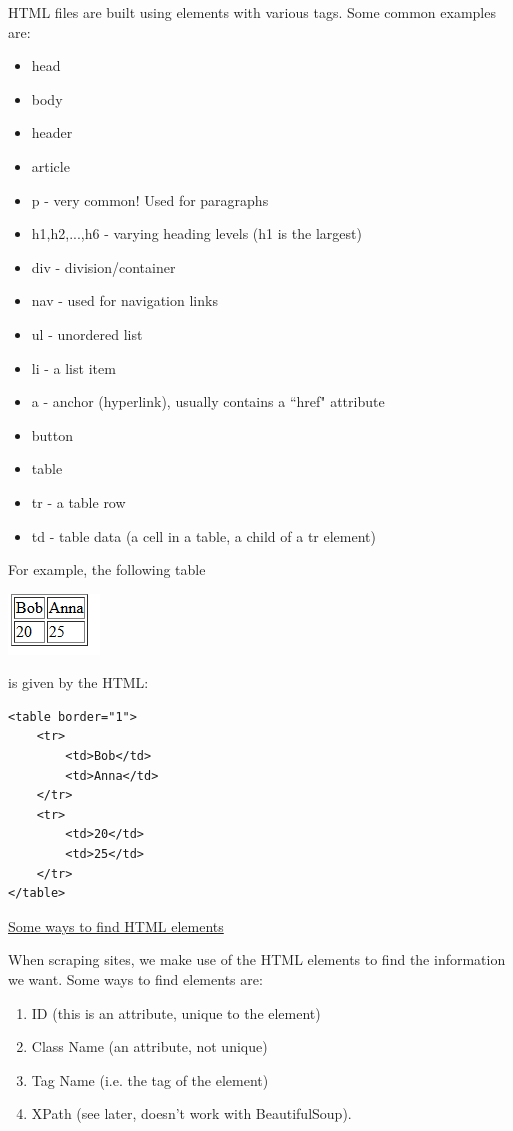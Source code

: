 \documentclass[8pt]{extarticle}
\begin{document}
\begin{multicols}{3}
HTML files are built using elements with various tags. Some common examples are:
\begin{itemize}
    \item head
    \item body
    \item header
    \item article
\columnbreak
    \item p - very common! Used for paragraphs
    \item h1,h2,...,h6 - varying heading levels (h1 is the largest)
    \item div - division/container
    \item nav - used for navigation links
    \item ul - unordered list
    \item li - a list item
    \item a - anchor (hyperlink), usually contains a ``href" attribute
    \item button
    \item table
    \item tr - a table row
    \item td - table data (a cell in a table, a child of a tr element)
\end{itemize}

For example, the following table 

\begin{center}
    \includegraphics[width=0.25\columnwidth]{images/2x2table.png}
\end{center}

is given by the HTML:

\begin{lstlisting}[style=html]
<table border="1">
    <tr>
        <td>Bob</td>
        <td>Anna</td>
    </tr>
    <tr>
        <td>20</td>
        <td>25</td>
    </tr>
</table>
\end{lstlisting}

\columnbreak
\begin{center}
    \underline{Some ways to find HTML elements}
\end{center}

When scraping sites, we make use of the HTML elements to find the information we want. Some ways to find elements are:
\begin{enumerate}
    \item ID (this is an attribute, unique to the element)
    \item Class Name (an attribute, not unique)
    \item Tag Name (i.e. the tag of the element)
    \item XPath (see later, doesn't work with BeautifulSoup).
\end{enumerate}


\end{multicols}
\end{document}
